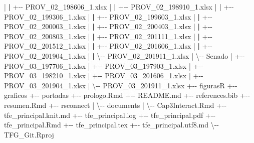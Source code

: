 \documentclass[12pt,a4paper,]{book}
\newenvironment{Shaded}{\begin{snugshade}}{\end{snugshade}}
\newcommand{\ErrorTok}[1]{\textcolor[rgb]{0.64,0.00,0.00}{\textbf{#1}}}
\newcommand{\NormalTok}[1]{#1}
\newcommand{\SpecialCharTok}[1]{\textcolor[rgb]{0.00,0.00,0.00}{#1}}
\numberwithin{dummy}{section}
\theoremstyle{ocrenumbox}
\theoremstyle{blacknumex}
\theoremstyle{blacknumbox}
\theoremstyle{ocrenum}
\theoremstyle{ocrenum}
\begin{document}
\begin{Shaded}
\begin{Highlighting}[]
\SpecialCharTok{|}   \ErrorTok{|}   \SpecialCharTok{+{-}{-}}\NormalTok{ PROV\_02\_198606\_1.xlsx}
\SpecialCharTok{|}   \ErrorTok{|}   \SpecialCharTok{+{-}{-}}\NormalTok{ PROV\_02\_198910\_1.xlsx}
\SpecialCharTok{|}   \ErrorTok{|}   \SpecialCharTok{+{-}{-}}\NormalTok{ PROV\_02\_199306\_1.xlsx}
\SpecialCharTok{|}   \ErrorTok{|}   \SpecialCharTok{+{-}{-}}\NormalTok{ PROV\_02\_199603\_1.xlsx}
\SpecialCharTok{|}   \ErrorTok{|}   \SpecialCharTok{+{-}{-}}\NormalTok{ PROV\_02\_200003\_1.xlsx}
\SpecialCharTok{|}   \ErrorTok{|}   \SpecialCharTok{+{-}{-}}\NormalTok{ PROV\_02\_200403\_1.xlsx}
\SpecialCharTok{|}   \ErrorTok{|}   \SpecialCharTok{+{-}{-}}\NormalTok{ PROV\_02\_200803\_1.xlsx}
\SpecialCharTok{|}   \ErrorTok{|}   \SpecialCharTok{+{-}{-}}\NormalTok{ PROV\_02\_201111\_1.xlsx}
\SpecialCharTok{|}   \ErrorTok{|}   \SpecialCharTok{+{-}{-}}\NormalTok{ PROV\_02\_201512\_1.xlsx}
\SpecialCharTok{|}   \ErrorTok{|}   \SpecialCharTok{+{-}{-}}\NormalTok{ PROV\_02\_201606\_1.xlsx}
\SpecialCharTok{|}   \ErrorTok{|}   \SpecialCharTok{+{-}{-}}\NormalTok{ PROV\_02\_201904\_1.xlsx}
\SpecialCharTok{|}   \ErrorTok{|}\NormalTok{   \textbackslash{}}\SpecialCharTok{{-}{-}}\NormalTok{ PROV\_02\_201911\_1.xlsx}
\SpecialCharTok{|}\NormalTok{   \textbackslash{}}\SpecialCharTok{{-}{-}}\NormalTok{ Senado}
\SpecialCharTok{|}       \SpecialCharTok{+{-}{-}}\NormalTok{ PROV\_03\_197706\_1.xlsx}
\SpecialCharTok{|}       \SpecialCharTok{+{-}{-}}\NormalTok{ PROV\_03\_197903\_1.xlsx}
\SpecialCharTok{|}       \SpecialCharTok{+{-}{-}}\NormalTok{ PROV\_03\_198210\_1.xlsx}
\SpecialCharTok{|}       \SpecialCharTok{+{-}{-}}\NormalTok{ PROV\_03\_201606\_1.xlsx}
\SpecialCharTok{|}       \SpecialCharTok{+{-}{-}}\NormalTok{ PROV\_03\_201904\_1.xlsx}
\SpecialCharTok{|}\NormalTok{       \textbackslash{}}\SpecialCharTok{{-}{-}}\NormalTok{ PROV\_03\_201911\_1.xlsx}
\SpecialCharTok{+{-}{-}}\NormalTok{ figurasR}
\SpecialCharTok{+{-}{-}}\NormalTok{ graficos}
\SpecialCharTok{+{-}{-}}\NormalTok{ portadas}
\SpecialCharTok{+{-}{-}}\NormalTok{ prologo.Rmd}
\SpecialCharTok{+{-}{-}}\NormalTok{ README.md}
\SpecialCharTok{+{-}{-}}\NormalTok{ references.bib}
\SpecialCharTok{+{-}{-}}\NormalTok{ resumen.Rmd}
\SpecialCharTok{+{-}{-}}\NormalTok{ rsconnect}
\SpecialCharTok{|}\NormalTok{   \textbackslash{}}\SpecialCharTok{{-}{-}}\NormalTok{ documents}
\SpecialCharTok{|}\NormalTok{       \textbackslash{}}\SpecialCharTok{{-}{-}}\NormalTok{ Cap3Interact.Rmd}
\SpecialCharTok{+{-}{-}}\NormalTok{ tfe\_principal.knit.md}
\SpecialCharTok{+{-}{-}}\NormalTok{ tfe\_principal.log}
\SpecialCharTok{+{-}{-}}\NormalTok{ tfe\_principal.pdf}
\SpecialCharTok{+{-}{-}}\NormalTok{ tfe\_principal.Rmd}
\SpecialCharTok{+{-}{-}}\NormalTok{ tfe\_principal.tex}
\SpecialCharTok{+{-}{-}}\NormalTok{ tfe\_principal.utf8.md}
\NormalTok{\textbackslash{}}\SpecialCharTok{{-}{-}}\NormalTok{ TFG\_Git.Rproj}
\end{Highlighting}
\end{Shaded}
\end{document}
